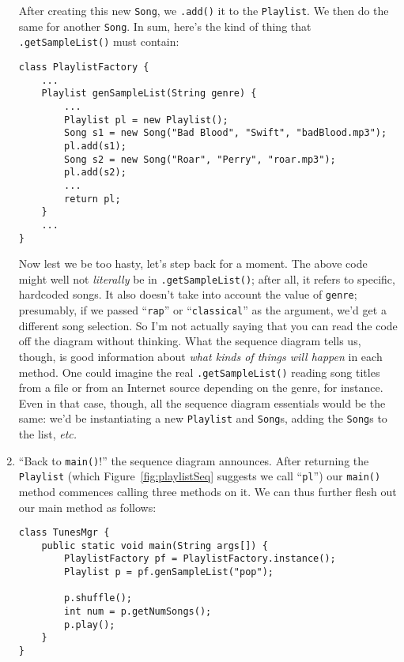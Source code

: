 \begin{enumerate}
After creating this new \texttt{Song}, we \texttt{.add()} it to the
\texttt{Playlist}. We then do the same for another \texttt{Song}. In sum,
here's the kind of thing that \texttt{.getSampleList()} must contain:

\begin{Verbatim}[fontsize=\scriptsize,samepage=true,frame=single]
class PlaylistFactory {
    ...
    Playlist genSampleList(String genre) {
        ...
        Playlist pl = new Playlist();
        Song s1 = new Song("Bad Blood", "Swift", "badBlood.mp3");
        pl.add(s1);
        Song s2 = new Song("Roar", "Perry", "roar.mp3");
        pl.add(s2);
		...
        return pl;
    }
    ...
}
\end{Verbatim}

Now lest we be too hasty, let's step back for a moment. The above code
might well not \textit{literally} be in \texttt{.getSampleList()}; after all,
it refers to specific, hardcoded songs. It also doesn't take into account the
value of \texttt{genre}; presumably, if we passed ``\texttt{rap}'' or
``\texttt{classical}'' as the argument, we'd get a different song selection. So
I'm not actually saying that you can read the code off the diagram without
thinking. What the sequence diagram tells us, though, is good information
about \textit{what kinds of things will happen} in each method. One could
imagine the real \texttt{.getSampleList()} reading song titles from a file or
from an Internet source depending on the genre, for instance. Even in that
case, though, all the sequence diagram essentials would be the same: we'd be
instantiating a new \texttt{Playlist} and \texttt{Song}s, adding the
\texttt{Song}s to the list, \textit{etc.}

\item ``Back to \texttt{main()}!'' the sequence diagram announces. After
returning the \texttt{Playlist} (which Figure~\ref{fig:playlistSeq} suggests
we call ``\texttt{pl}'') our \texttt{main()} method commences calling three
methods on it. We can thus further flesh out our main method as follows:

\begin{Verbatim}[fontsize=\footnotesize,samepage=true,frame=single]
class TunesMgr {
    public static void main(String args[]) {
        PlaylistFactory pf = PlaylistFactory.instance();
        Playlist p = pf.genSampleList("pop");

        p.shuffle();
        int num = p.getNumSongs();
        p.play();
    }
}
\end{Verbatim}


\end{enumerate}

